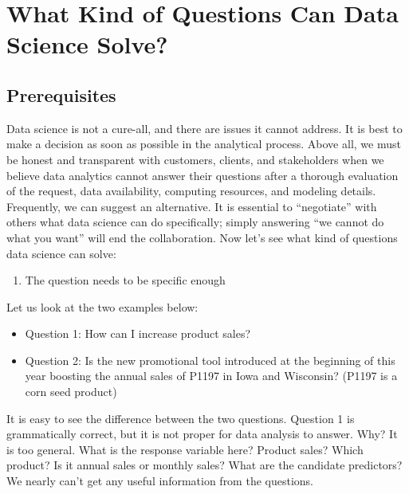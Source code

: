 \documentclass[
  12pt,
]{krantz}
\providecommand{\tightlist}{%
  \setlength{\itemsep}{0pt}\setlength{\parskip}{0pt}}
\begin{document}
\hypertarget{what-kind-of-questions-can-data-science-solve}{%
\section{What Kind of Questions Can Data Science Solve?}\label{what-kind-of-questions-can-data-science-solve}}

\hypertarget{prerequisites}{%
\subsection{Prerequisites}\label{prerequisites}}

Data science is not a cure-all, and there are issues it cannot address. It is best to make a decision as soon as possible in the analytical process. Above all, we must be honest and transparent with customers, clients, and stakeholders when we believe data analytics cannot answer their questions after a thorough evaluation of the request, data availability, computing resources, and modeling details. Frequently, we can suggest an alternative. It is essential to ``negotiate'' with others what data science can do specifically; simply answering ``we cannot do what you want'' will end the collaboration. Now let's see what kind of questions data science can solve:

\begin{enumerate}
\def\labelenumi{\arabic{enumi}.}
\tightlist
\item
  The question needs to be specific enough
\end{enumerate}

Let us look at the two examples below:

\begin{itemize}
\tightlist
\item
  Question 1: How can I increase product sales?
\item
  Question 2: Is the new promotional tool introduced at the beginning of this year boosting the annual sales of P1197 in Iowa and Wisconsin? (P1197 is a corn seed product)
\end{itemize}

It is easy to see the difference between the two questions. Question 1 is grammatically correct, but it is not proper for data analysis to answer. Why? It is too general. What is the response variable here? Product sales? Which product? Is it annual sales or monthly sales? What are the candidate predictors? We nearly can't get any useful information from the questions.
\end{document}
